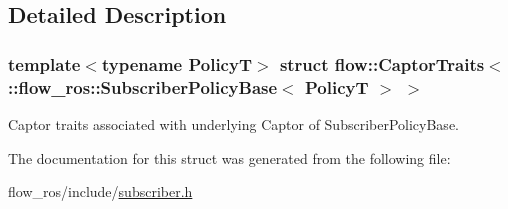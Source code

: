 \subsection{Detailed Description}
\subsubsection*{template$<$typename PolicyT$>$\newline
struct flow\+::\+Captor\+Traits$<$\+::flow\+\_\+ros\+::\+Subscriber\+Policy\+Base$<$ Policy\+T $>$ $>$}

Captor traits associated with underlying Captor of Subscriber\+Policy\+Base. 

The documentation for this struct was generated from the following file\+:\begin{DoxyCompactItemize}
\item 
flow\+\_\+ros/include/\hyperlink{subscriber_8h}{subscriber.\+h}\end{DoxyCompactItemize}
